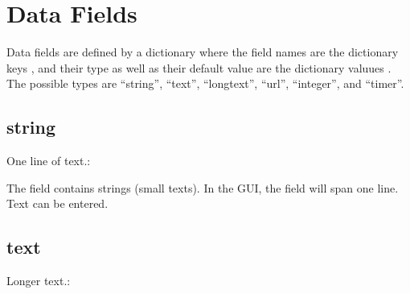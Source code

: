 \documentclass[letterpaper,10pt,english]{sphinxmanual}
\begin{document}
\sphinxstepscope


\chapter{Data Fields}
\label{\detokenize{data-fields:data-fields}}\label{\detokenize{data-fields::doc}}
\sphinxAtStartPar
Data fields are defined by a dictionary  where the field names are the dictionary keys , and their type as well as their default value are the dictionary valuues .
The possible types are “string”, “text”, “longtext”, “url”, “integer”, and “timer”.


\section{string}
\label{\detokenize{data-fields:string}}
\sphinxAtStartPar
One line of text.:

\begin{sphinxVerbatim}[commandchars=\\\{\}]
    
\end{sphinxVerbatim}

\sphinxAtStartPar
The field contains strings (small texts). In the GUI, the field will span one line. Text can be entered.


\section{text}
\label{\detokenize{data-fields:text}}
\sphinxAtStartPar
Longer text.:

\begin{sphinxVerbatim}[commandchars=\\\{\}]
    
\end{sphinxVerbatim}
\end{document}
